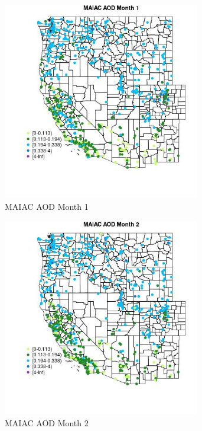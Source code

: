 \begin{figure} 
\centering  
\includegraphics[width=0.77\textwidth]{Code_Outputs/Report_ML_input_PM25_Step4_part_f_de_duplicated_aveswNAs_MapObsMo1MAIAC_AOD.jpg} 
\caption{\label{fig:Report_ML_input_PM25_Step4_part_f_de_duplicated_aveswNAsMapObsMo1MAIAC_AOD}MAIAC AOD Month 1} 
\end{figure} 
 

\clearpage 

\begin{figure} 
\centering  
\includegraphics[width=0.77\textwidth]{Code_Outputs/Report_ML_input_PM25_Step4_part_f_de_duplicated_aveswNAs_MapObsMo2MAIAC_AOD.jpg} 
\caption{\label{fig:Report_ML_input_PM25_Step4_part_f_de_duplicated_aveswNAsMapObsMo2MAIAC_AOD}MAIAC AOD Month 2} 
\end{figure} 
 

